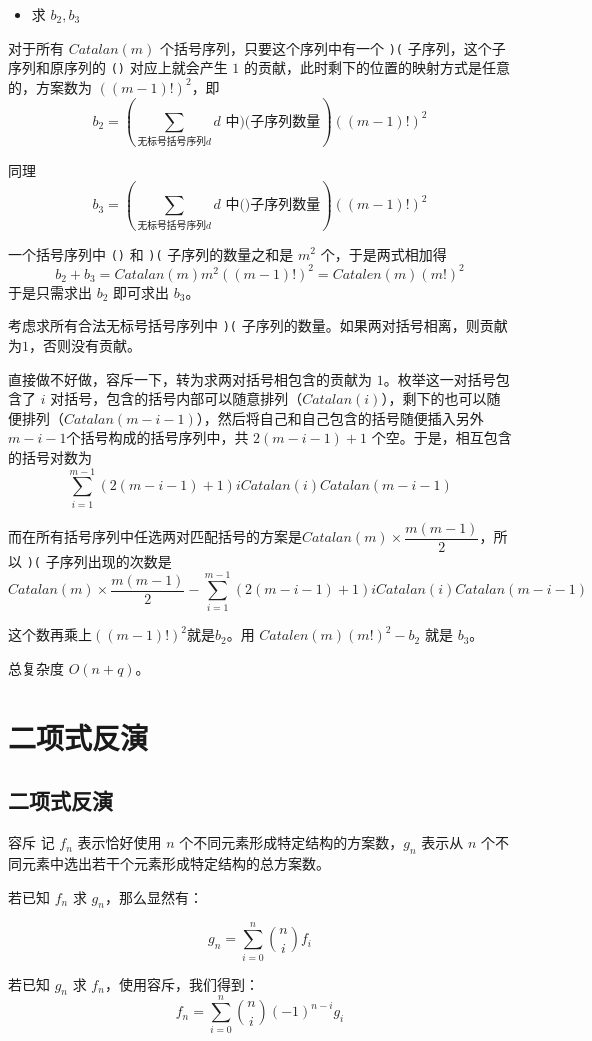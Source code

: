 \documentclass[UTF8]{beamer}
\begin{document}
    \begin{frame}
        \begin{itemize}
            \item 求 $b_2,b_3$
        \end{itemize}

        对于所有 $Catalan(m)$ 个括号序列，只要这个序列中有一个 \texttt{)(} 子序列，这个子序列和原序列的 \texttt{()} 对应上就会产生 $1$ 的贡献，此时剩下的位置的映射方式是任意的，方案数为 $((m-1)!)^2$，即
        $$
        b_2 = \left(\sum_{\text{无标号括号序列}d} d\text{ 中)(子序列数量}\right) ((m-1)!)^2
        $$

        同理
        $$
        b_3 = \left(\sum_{\text{无标号括号序列}d} d\text{ 中()子序列数量}\right) ((m-1)!)^2
        $$

        一个括号序列中 \texttt{()} 和 \texttt{)(} 子序列的数量之和是 $m^2$ 个，于是两式相加得
        $$
        b_2+b_3 = Catalan(m)m^2((m-1)!)^2=Catalen(m)(m!)^2
        $$
        于是只需求出 $b_2$ 即可求出 $b_3$。
    \end{frame}
    \begin{frame}
        考虑求所有合法无标号括号序列中 \texttt{)(} 子序列的数量。如果两对括号相离，则贡献为$1$，否则没有贡献。
        
        直接做不好做，容斥一下，转为求两对括号相包含的贡献为 $1$。枚举这一对括号包含了 $i$ 对括号，包含的括号内部可以随意排列（$Catalan(i)$），剩下的也可以随便排列（$Catalan(m-i-1)$），然后将自己和自己包含的括号随便插入另外$m-i-1$个括号构成的括号序列中，共 $2(m-i-1)+1$ 个空。于是，相互包含的括号对数为
$$
\sum_{i=1}^{m-1}(2(m-i-1)+1)iCatalan(i)Catalan(m-i-1)
$$

\vspace{-1em}
而在所有括号序列中任选两对匹配括号的方案是$Catalan(m)\times \dfrac{m(m-1)}{2}$，所以 \texttt{)(} 子序列出现的次数是
$$
Catalan(m)\times \dfrac{m(m-1)}{2}-\sum_{i=1}^{m-1}(2(m-i-1)+1)iCatalan(i)Catalan(m-i-1)
$$

这个数再乘上$((m-1)!)^2$就是$b_2$。用 $Catalen(m)(m!)^2-b_2$ 就是 $b_3$。

总复杂度 $O(n+q)$。
    \end{frame}

    \section{二项式反演}
    \subsection{二项式反演}
    \begin{frame}{容斥}
        记 $f_n$ 表示恰好使用 $n$ 个不同元素形成特定结构的方案数，$g_n$ 表示从 $n$ 个不同元素中选出若干个元素形成特定结构的总方案数。

若已知 $f_n$ 求 $g_n$，那么显然有：

$$
g_n = \sum_{i = 0}^{n} \binom{n}{i} f_i
$$

若已知 $g_n$ 求 $f_n$，使用容斥，我们得到：
$$
f_n = \sum_{i = 0}^{n} \binom{n}{i} (-1)^{n-i} g_i
$$

    \end{frame}
\end{document}
